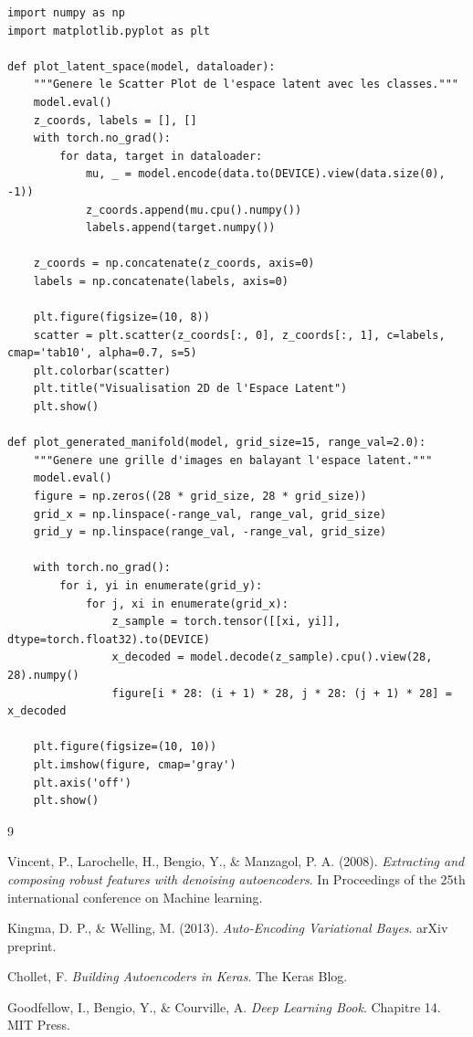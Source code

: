 \documentclass[11pt,a4paper]{report}
\begin{document}
\begin{lstlisting}[caption=Scripts de visualisation (Scatter Plot et Manifold)]
import numpy as np
import matplotlib.pyplot as plt

def plot_latent_space(model, dataloader):
    """Genere le Scatter Plot de l'espace latent avec les classes."""
    model.eval()
    z_coords, labels = [], []
    with torch.no_grad():
        for data, target in dataloader:
            mu, _ = model.encode(data.to(DEVICE).view(data.size(0), -1))
            z_coords.append(mu.cpu().numpy())
            labels.append(target.numpy())
            
    z_coords = np.concatenate(z_coords, axis=0)
    labels = np.concatenate(labels, axis=0)
    
    plt.figure(figsize=(10, 8))
    scatter = plt.scatter(z_coords[:, 0], z_coords[:, 1], c=labels, cmap='tab10', alpha=0.7, s=5)
    plt.colorbar(scatter)
    plt.title("Visualisation 2D de l'Espace Latent")
    plt.show()

def plot_generated_manifold(model, grid_size=15, range_val=2.0):
    """Genere une grille d'images en balayant l'espace latent."""
    model.eval()
    figure = np.zeros((28 * grid_size, 28 * grid_size))
    grid_x = np.linspace(-range_val, range_val, grid_size)
    grid_y = np.linspace(range_val, -range_val, grid_size)
    
    with torch.no_grad():
        for i, yi in enumerate(grid_y):
            for j, xi in enumerate(grid_x):
                z_sample = torch.tensor([[xi, yi]], dtype=torch.float32).to(DEVICE)
                x_decoded = model.decode(z_sample).cpu().view(28, 28).numpy()
                figure[i * 28: (i + 1) * 28, j * 28: (j + 1) * 28] = x_decoded
                
    plt.figure(figsize=(10, 10))
    plt.imshow(figure, cmap='gray')
    plt.axis('off')
    plt.show()
\end{lstlisting}





\renewcommand{\bibname}{Références bibliographiques}

\begin{thebibliography}{9}

Vincent, P., Larochelle, H., Bengio, Y., \& Manzagol, P. A. (2008).
\textit{Extracting and composing robust features with denoising autoencoders}. In Proceedings of the 25th international conference on Machine learning.

Kingma, D. P., \& Welling, M. (2013).
\textit{Auto-Encoding Variational Bayes}. arXiv preprint.

Chollet, F.
\textit{Building Autoencoders in Keras}. The Keras Blog.

Goodfellow, I., Bengio, Y., \& Courville, A.
\textit{Deep Learning Book}. Chapitre 14. MIT Press.

\end{thebibliography}
\end{document}
